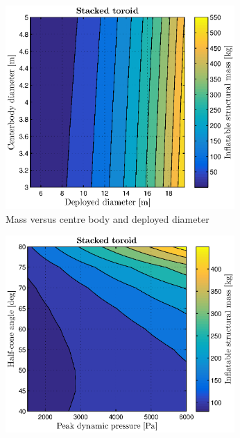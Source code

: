 \begin{figure}[ht]
	\centering

	\begin{subfigure}[b]{0.49\textwidth}
		\includegraphics[width=0.96\textwidth]{./Figure/Structure/diameters_test.eps}
		\caption{Mass versus centre body and deployed diameter}
		\label{fig:diameters_strucmass}
	\end{subfigure}
	\begin{subfigure}[b]{0.49\textwidth}
		\includegraphics[width=0.96\textwidth]{./Figure/Structure/halfcone_test.eps}

\end{subfigure}
\end{figure}
